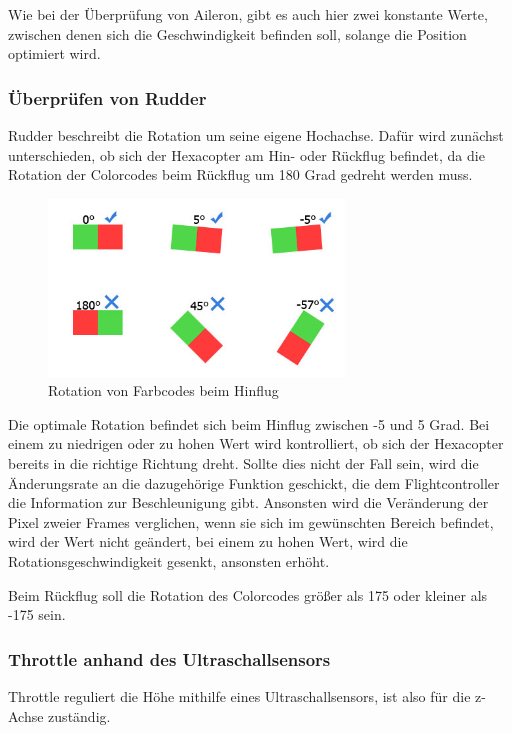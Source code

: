     Wie bei der Überprüfung von Aileron, gibt es auch hier zwei konstante Werte, zwischen denen sich die Geschwindigkeit befinden soll, solange die Position optimiert wird.

    \subsubsection{Überprüfen von Rudder}
    Rudder beschreibt die Rotation um seine eigene Hochachse. Dafür wird zunächst unterschieden, ob sich der Hexacopter am Hin- oder Rückflug befindet, da die Rotation der Colorcodes beim Rückflug um 180 Grad gedreht werden muss.

    \begin{figure} [H]
      \begin{centering}
        \includegraphics[width = 0.7\textwidth]{Bilder/bor_rotation}
      \par\end{centering}
      \caption{Rotation von Farbcodes beim Hinflug}
      \label{Rotation_Farbcode}
    \end{figure}

    Die optimale Rotation befindet sich beim Hinflug zwischen -5 und 5 Grad.
    Bei einem zu niedrigen oder zu hohen Wert wird kontrolliert, ob sich der Hexacopter bereits in die richtige Richtung dreht.
    Sollte dies nicht der Fall sein, wird die Änderungsrate an die dazugehörige Funktion geschickt, die dem Flightcontroller die Information zur Beschleunigung gibt.
    Ansonsten wird die Veränderung der Pixel zweier Frames verglichen, wenn sie sich im gewünschten Bereich befindet, wird der Wert nicht geändert, bei einem zu hohen Wert, wird die Rotationsgeschwindigkeit gesenkt, ansonsten erhöht.

    Beim Rückflug soll die Rotation des Colorcodes größer als 175 oder kleiner als -175 sein.

    \subsubsection{Throttle anhand des Ultraschallsensors}
    Throttle reguliert die Höhe mithilfe eines Ultraschallsensors, ist also für die z-Achse zuständig.

